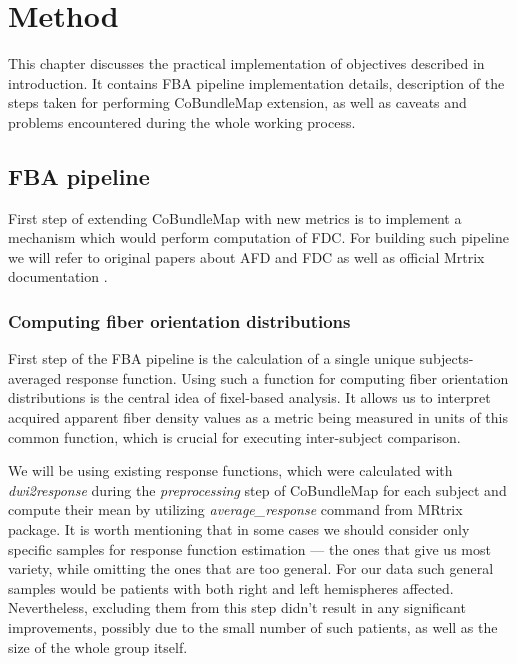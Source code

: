 \documentclass[thesis.tex]{subfiles}
\begin{document}
\chapter{Method}
This chapter discusses the practical implementation of objectives described in introduction. It contains FBA pipeline implementation details, description of the steps taken for performing CoBundleMap extension, as well as caveats and problems encountered during the whole working process.

\section{FBA pipeline}
First step of extending CoBundleMap with new metrics is to implement a mechanism which would perform computation of FDC. For building such pipeline we will refer to original papers about AFD \cite{afd2012Raffelt} and FDC \cite{fdcAndFBA2017Raffelt} as well as official Mrtrix documentation \cite{mrtrixDocu, mrtrixGeneral2019}.

\subsection{Computing fiber orientation distributions}
First step of the FBA pipeline is the calculation of a single unique subjects-averaged response function. Using such a function for computing fiber orientation distributions is the central idea of fixel-based analysis. It allows us to interpret acquired apparent fiber density values as a metric being measured in units of this common function, which is crucial for executing inter-subject comparison.

We will be using existing response functions, which were calculated with \textit{dwi2response} \cite{dwi2response} during the \textit{preprocessing} step of CoBundleMap for each subject and compute their mean by utilizing \textit{average\_response} command from MRtrix package. It is worth mentioning that in some cases we should consider only specific samples for response function estimation --- the ones that give us most variety, while omitting the ones that are too general. For our data such general samples would be patients with both right and left hemispheres affected. Nevertheless, excluding them from this step didn't result in any significant improvements, possibly due to the small number of such patients, as well as the size of the whole group itself. 
\end{document}
